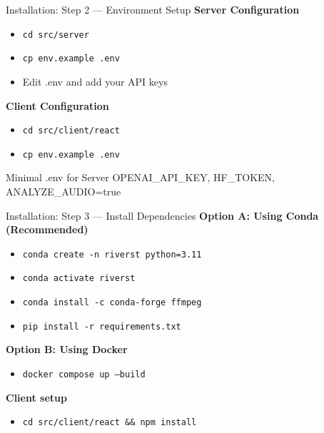 \documentclass[aspectratio=169]{beamer}
\begin{document}
\begin{frame}{Installation: Step 2 — Environment Setup}
\textbf{Server Configuration}
\begin{itemize}
    \item \texttt{cd src/server}
    \item \texttt{cp env.example .env}
    \item Edit .env and add your API keys
\end{itemize}

\vspace{0.3cm}

\textbf{Client Configuration}
\begin{itemize}
    \item \texttt{cd src/client/react}
    \item \texttt{cp env.example .env}
\end{itemize}

\vspace{0.3cm}

\begin{block}{Minimal .env for Server}
OPENAI\_API\_KEY, HF\_TOKEN, ANALYZE\_AUDIO=true
\end{block}
\end{frame}

\begin{frame}{Installation: Step 3 — Install Dependencies}
\textbf{Option A: Using Conda (Recommended)}
\begin{itemize}
    \item \texttt{conda create -n riverst python=3.11}
    \item \texttt{conda activate riverst}
    \item \texttt{conda install -c conda-forge ffmpeg}
    \item \texttt{pip install -r requirements.txt}
\end{itemize}

\vspace{0.3cm}

\textbf{Option B: Using Docker}
\begin{itemize}
    \item \texttt{docker compose up --build}
\end{itemize}

\vspace{0.3cm}

\textbf{Client setup}
\begin{itemize}
    \item \texttt{cd src/client/react \&\& npm install}
\end{itemize}
\end{frame}
\end{document}
